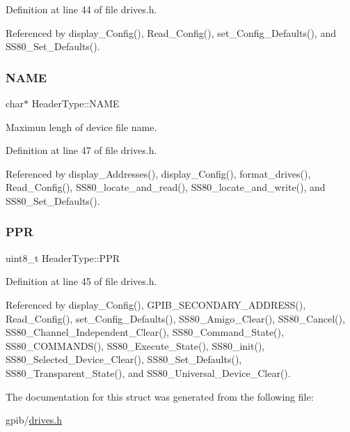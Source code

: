 Definition at line 44 of file drives.\+h.



Referenced by display\+\_\+\+Config(), Read\+\_\+\+Config(), set\+\_\+\+Config\+\_\+\+Defaults(), and S\+S80\+\_\+\+Set\+\_\+\+Defaults().

\mbox{\label{structHeaderType_a51c3f7025d3bc22c479e44f158471537}} 
\subsubsection{\texorpdfstring{N\+A\+ME}{NAME}}
{\footnotesize\ttfamily char$\ast$ Header\+Type\+::\+N\+A\+ME}



Maximun lengh of device file name. 



Definition at line 47 of file drives.\+h.



Referenced by display\+\_\+\+Addresses(), display\+\_\+\+Config(), format\+\_\+drives(), Read\+\_\+\+Config(), S\+S80\+\_\+locate\+\_\+and\+\_\+read(), S\+S80\+\_\+locate\+\_\+and\+\_\+write(), and S\+S80\+\_\+\+Set\+\_\+\+Defaults().

\mbox{\label{structHeaderType_ac642cdad0f3874495afa0ab687a56fd0}} 
\subsubsection{\texorpdfstring{P\+PR}{PPR}}
{\footnotesize\ttfamily uint8\+\_\+t Header\+Type\+::\+P\+PR}



Definition at line 45 of file drives.\+h.



Referenced by display\+\_\+\+Config(), G\+P\+I\+B\+\_\+\+S\+E\+C\+O\+N\+D\+A\+R\+Y\+\_\+\+A\+D\+D\+R\+E\+S\+S(), Read\+\_\+\+Config(), set\+\_\+\+Config\+\_\+\+Defaults(), S\+S80\+\_\+\+Amigo\+\_\+\+Clear(), S\+S80\+\_\+\+Cancel(), S\+S80\+\_\+\+Channel\+\_\+\+Independent\+\_\+\+Clear(), S\+S80\+\_\+\+Command\+\_\+\+State(), S\+S80\+\_\+\+C\+O\+M\+M\+A\+N\+D\+S(), S\+S80\+\_\+\+Execute\+\_\+\+State(), S\+S80\+\_\+init(), S\+S80\+\_\+\+Selected\+\_\+\+Device\+\_\+\+Clear(), S\+S80\+\_\+\+Set\+\_\+\+Defaults(), S\+S80\+\_\+\+Transparent\+\_\+\+State(), and S\+S80\+\_\+\+Universal\+\_\+\+Device\+\_\+\+Clear().



The documentation for this struct was generated from the following file\+:\begin{DoxyCompactItemize}
\item 
gpib/\hyperlink{drives_8h}{drives.\+h}\end{DoxyCompactItemize}
